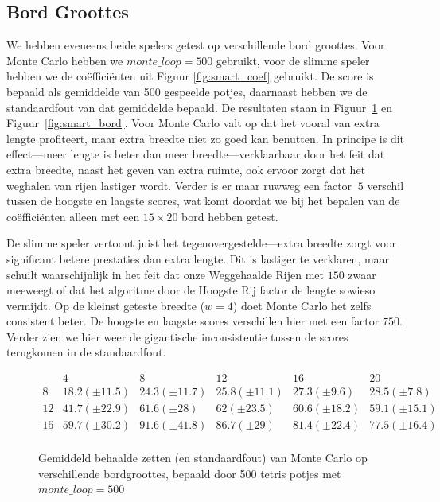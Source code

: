 \documentclass[10pt]{article}
\begin{document}
\subsection{Bord Groottes}
We hebben eveneens beide spelers getest op verschillende bord groottes. Voor Monte Carlo hebben we $monte\_loop = 500$ gebruikt, voor de slimme speler hebben we de co\"effici\"enten uit Figuur \ref{fig:smart_coef} gebruikt. De score is bepaald als gemiddelde van 500 gespeelde potjes, daarnaast hebben we de standaardfout van dat gemiddelde bepaald. De resultaten staan in Figuur~\ref{fig:monte_bord} en Figuur~\ref{fig:smart_bord}. Voor Monte Carlo valt op dat het vooral van extra lengte profiteert, maar extra breedte niet zo goed kan benutten. In principe is dit effect---meer lengte is beter dan meer breedte---verklaarbaar door het feit dat extra breedte, naast het geven van extra ruimte, ook ervoor zorgt dat het weghalen van rijen lastiger wordt. Verder is er maar ruwweg een factor $~5$ verschil tussen de hoogste en laagste scores, wat komt doordat we bij het bepalen van de co\"effici\"enten alleen met een $15 \times 20$ bord hebben getest.

De slimme speler vertoont juist het tegenovergestelde---extra breedte zorgt voor significant betere prestaties dan extra lengte. Dit is lastiger te verklaren, maar schuilt waarschijnlijk in het feit dat onze Weggehaalde Rijen met $150$ zwaar meeweegt of dat het algoritme door de Hoogste Rij factor de lengte sowieso vermijdt. Op de kleinst geteste breedte ($w=4$) doet Monte Carlo het zelfs consistent beter. De hoogste en laagste scores verschillen hier met een factor $750$. Verder zien we hier weer de gigantische inconsistentie tussen de scores terugkomen in de standaardfout.

\begin{figure}
$$\begin{array}{l||c|c|c|c|c}
	    & 4 			& 8 			   & 12 			& 16 			 & 20 \\ 
	\hline\hline
	8  & 18.2 (\pm 11.5) 	& 24.3 (\pm 11.7) & 25.8 (\pm 11.1)  & 27.3 (\pm 9.6)  & 28.5 (\pm 7.8) \\
	12 & 41.7 (\pm 22.9) & 61.6 (\pm 28)    & 62 (\pm 23.5)     & 60.6 (\pm 18.2) & 59.1 (\pm 15.1)  \\
	15 & 59.7 (\pm 30.2) & 91.6 (\pm 41.8) & 86.7 (\pm 29)     & 81.4 (\pm 22.4) & 77.5 (\pm 16.4) \\
\end{array}$$
\caption{Gemiddeld behaalde zetten (en standaardfout) van Monte Carlo op verschillende bordgroottes, bepaald door 500 tetris potjes met $monte\_loop=500$}\label{fig:monte_bord}
\end{figure}
\end{document}
